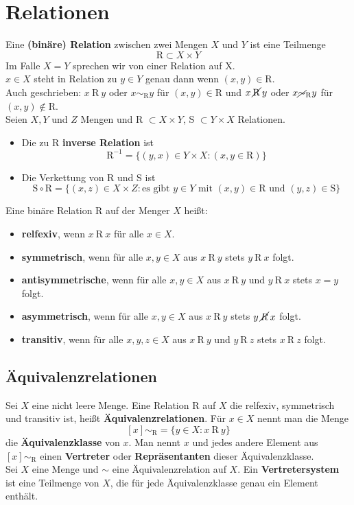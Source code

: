 \documentclass[12pt]{article}
\begin{document}
\section{Relationen}
Eine \textbf{(binäre) Relation} zwischen zwei Mengen $X$ und $Y$ ist eine Teilmenge
\[\text{R} \subset X \times Y\]
Im Falle $X = Y$ sprechen wir von einer Relation auf X. \\
$x \in X$ steht in Relation zu $y \in Y$ genau dann wenn $(x, y) \in \text{R}$. \\
Auch geschrieben: $x\:\text{R}\:y$ oder $x \sim_{\text{R}} y$ für $(x, y) \in \text{R}$ und $x\:\cancel{\text{R}}\:y$ oder $x \cancel{\sim}_{\text{R}} y$ für $(x,y) \notin \text{R}$. \\ \newline
Seien $X, Y$ und $Z$ Mengen und R $\subset X \times Y$, S $\subset Y \times X$ Relationen.
\begin{itemize}
    \item Die zu R \textbf{inverse Relation} ist \[\text{R}^{-1} = \{(y,x) \in Y \times X : (x, y \in \text{R})\}\]
    \item Die Verkettung von R und S ist \[\text{S} \circ \text{R} = \{(x,z) \in X \times Z : \text{es gibt } y \in Y \text{ mit } (x,y) \in \text{R und } (y,z) \in \text{S}\}\]
\end{itemize}
Eine binäre Relation R auf der Menger $X$ heißt:
\begin{itemize}
    \item \textbf{relfexiv}, wenn $x\:\text{R}\:x$ für alle $x \in X$.
    \item \textbf{symmetrisch}, wenn für alle $x, y \in X$ aus $x\:\text{R}\:y$ stets $y\:\text{R}\:x$ folgt.
    \item \textbf{antisymmetrische}, wenn für alle $x, y \in X$ aus $x\:\text{R}\:y$ und $y\:\text{R}\:x$ stets $x = y$ folgt.
    \item \textbf{asymmetrisch}, wenn für alle $x, y \in X$ aus $x\:\text{R}\:y$ stets $y\:\cancel{R}\:x$ folgt.
    \item \textbf{transitiv}, wenn für alle $x, y, z \in X$ aus $x\:\text{R}\:y$ und $y\:\text{R}\:z$ stets $x\:\text{R}\:z$ folgt.
\end{itemize}
\subsection{Äquivalenzrelationen}
Sei $X$ eine nicht leere Menge. Eine Relation R auf $X$ die relfexiv, symmetrisch und transitiv ist, heißt \textbf{Äquivalenzrelationen}. Für $x \in X$ nennt man die Menge
\[[x]\sim_{\text{R}} = \{y \in X : x\:\text{R}\:y\}\]
die \textbf{Äquivalenzklasse} von $x$. Man nennt $x$ und jedes andere Element aus $[x]\sim_{\text{R}}$ einen \textbf{Vertreter} oder \textbf{Repräsentanten} dieser Äquivalenzklasse. \\
\newline
Sei $X$ eine Menge und $\sim$ eine Äquivalenzrelation auf $X$. Ein \textbf{Vertretersystem} ist eine Teilmenge von $X$, die für jede Äquivalenzklasse genau ein Element enthält.
\end{document}
